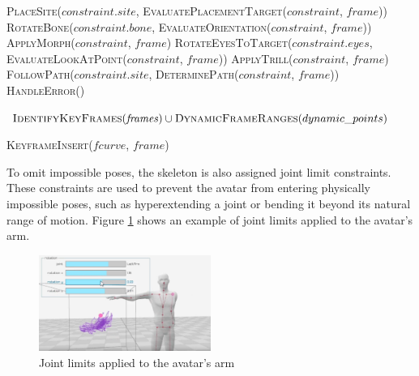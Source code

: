 \documentclass[../../main.tex]{subfiles}
\begin{document}
\begin{algorithm}
\begin{algorithmic}[1]
                \State \textsc{PlaceSite}($constraint.site$, \textsc{EvaluatePlacementTarget}($constraint$, $frame$))
                \State \textsc{RotateBone}($constraint.bone$, \textsc{EvaluateOrientation}($constraint$, $frame$))
                \State \textsc{ApplyMorph}($constraint$, $frame$)
                \State \textsc{RotateEyesToTarget}($constraint.eyes$, \textsc{EvaluateLookAtPoint}($constraint$, $frame$))
                \State \textsc{ApplyTrill}($constraint$, $frame$)
                \State \textsc{FollowPath}($constraint.site$, \textsc{DeterminePath}($constraint$, $frame$))
            \Else
                \State \textsc{HandleError}()
            \EndIf
        \EndProcedure
        
            \State \Return $\textsc{IdentifyKeyFrames}(\mathit{frames}) \cup \textsc{DynamicFrameRanges}(dynamic\_points)$
        \EndProcedure
        
                \State \textsc{KeyframeInsert}($fcurve$, $frame$)
            \EndFor
        \EndProcedure
    \end{algorithmic}
\end{algorithm}

To omit impossible poses, the skeleton is also assigned joint limit constraints. These constraints are used to prevent the avatar from entering physically impossible poses, such as hyperextending a joint or bending it beyond its natural range of motion. Figure \ref{fig:joint_limits} shows an example of joint limits applied to the avatar's arm.

\begin{figure}
    \centering
    \includegraphics[width=0.5\textwidth]{chapters/rigging_layers/images/joint_limits.png}
    \caption{Joint limits applied to the avatar's arm}
    \label{fig:joint_limits}
\end{figure}
\end{document}
